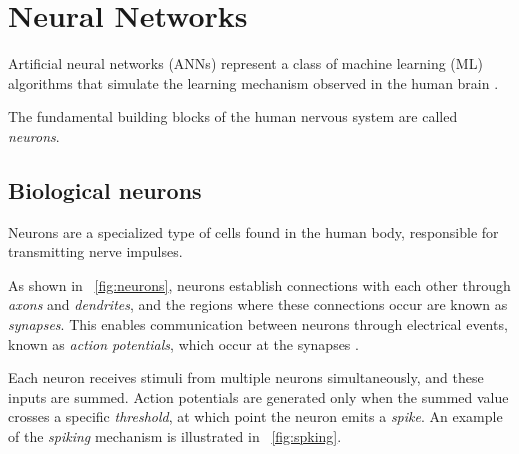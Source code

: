 \section{Neural Networks}
Artificial neural networks (ANNs) represent a class of machine learning (ML) algorithms that simulate the learning mechanism observed in the human brain \cite{aggarwal2018neural}. 

The fundamental building blocks of the human nervous system are called \textit{neurons}. 

\subsection{Biological neurons}

Neurons are a specialized type of cells found in the human body, responsible for transmitting nerve impulses.

As shown in \Fig~\ref{fig:neurons}, neurons establish connections with each other through \textit{axons} and \textit{dendrites}, and the regions where these connections occur are known as \textit{synapses}. This enables communication between neurons through electrical events, known as \textit{action potentials}, which occur at the synapses \cite{APS}. 

Each neuron receives stimuli from multiple neurons simultaneously, and these inputs are summed. Action potentials are generated only when the summed value crosses a specific \textit{threshold}, at which point the neuron emits a \textit{spike}. An example of the \textit{spiking} mechanism is illustrated in \Fig~\ref{fig:spking}.

